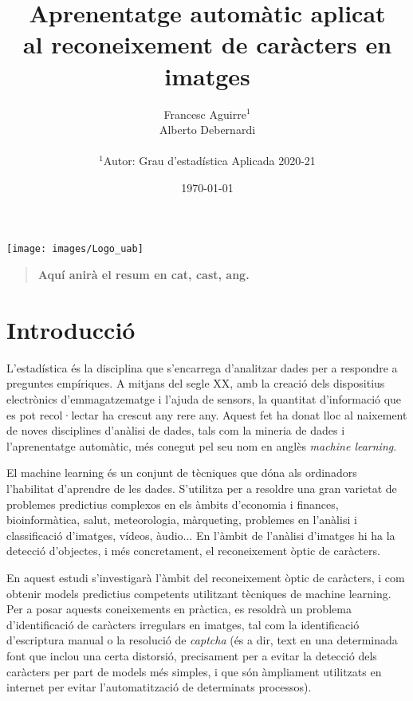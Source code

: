 \documentclass[12pt, spanish]{article}
\title{Aprenentatge automàtic aplicat \\ al reconeixement de caràcters en imatges}
\author
{\large{Francesc Aguirre$^{1}$} \\
 \small{Alberto Debernardi}\\
\\
\normalsize{$^{1}$Autor: Grau d'estadística Aplicada 2020-21}\\
}
\date{\today}
\newenvironment{sciabstract}{%
\begin{quote} \bf}
{\end{quote}}
\begin{document}
 

\baselineskip24pt

\maketitle 

\baselineskip24pt

\begin{center}
	\texttt{[image: images/Logo\_uab]}\par\vspace{1cm}
\end{center}

\clearpage



\begin{sciabstract}
  Aquí anirà el resum en cat, cast, ang.
\end{sciabstract}

\clearpage

\tableofcontents

\clearpage

\section{Introducció}

L'estadística és la disciplina que s'encarrega d'analitzar dades per a respondre a preguntes empíriques. A mitjans del segle XX, amb la creació dels dispositius electrònics d'emmagatze\-matge i l'ajuda de sensors, la quantitat d'informació que es pot recol·lectar ha crescut any rere any. Aquest fet ha donat lloc al naixement de noves disciplines d'anàlisi de dades, tals com la mineria de dades i l'aprenentatge automàtic, més conegut pel seu nom en anglès \textit{machine learning}.

El machine learning és un conjunt de tècniques que dóna als ordinadors l'habilitat d'aprendre de les dades. S'utilitza per a resoldre una gran varietat de problemes predictius complexos en els àmbits d'economia i finances, bioinformàtica, salut, meteorologia, màrqueting, problemes en l'anàlisi i classificació d'imatges, vídeos, àudio... En l'àmbit de l'anàlisi d'imatges hi ha la detecció d'objectes, i més concretament, el reconeixement òptic de caràcters. 

En aquest estudi s'investigarà l'àmbit del reconeixement òptic de caràcters, i com obtenir models predictius competents utilitzant tècniques de machine learning. Per a posar aquests coneixements en pràctica, es resoldrà un problema d'identificació de caràcters irregulars en imatges, tal com la identificació d'escriptura manual o la resolució de \textit{captcha} (és a dir, text en una determinada font que inclou una certa distorsió, precisament per a evitar la detecció dels caràcters per part de models més simples, i que són àmpliament utilitzats en internet per evitar l'automatització de determinats processos).
\end{document}
